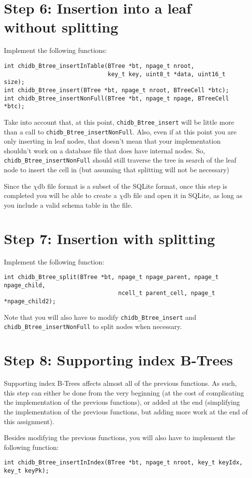 \documentclass[10pt]{article}
\newcommand{\chidb}{$\chi$\textsf{db}}
\begin{document}
\section*{Step 6: Insertion into a leaf without splitting}

Implement the following functions:

\begin{verbatim}
int chidb_Btree_insertInTable(BTree *bt, npage_t nroot, 
                              key_t key, uint8_t *data, uint16_t size);
int chidb_Btree_insert(BTree *bt, npage_t nroot, BTreeCell *btc);
int chidb_Btree_insertNonFull(BTree *bt, npage_t npage, BTreeCell *btc);
\end{verbatim}

Take into account that, at this point, \verb+chidb_Btree_insert+ will be little more than a call to \verb+chidb_Btree_insertNonFull+. Also, even if at this point you are only inserting in leaf nodes, that doesn't mean that your implementation shouldn't work on a database file that does have internal nodes. So, \verb+chidb_Btree_insertNonFull+ should still traverse the tree in search of the leaf node to insert the cell in (but assuming that splitting will not be necessary)

Since the \chidb{} file format is a subset of the SQLite format, once this step is completed you will be able to create a \chidb{} file and open it in SQLite, as long as you include a valid schema table in the file.

\section*{Step 7: Insertion with splitting}

Implement the following function:

\begin{verbatim}
int chidb_Btree_split(BTree *bt, npage_t npage_parent, npage_t npage_child, 
                                 ncell_t parent_cell, npage_t *npage_child2);
\end{verbatim}

Note that you will also have to modify \verb+chidb_Btree_insert+ and \verb+chidb_Btree_insertNonFull+ to split nodes when necessary.

\section*{Step 8: Supporting index B-Trees}

Supporting index B-Trees affects almost all of the previous functions. As such, this step can either be done from the very beginning (at the cost of complicating the implementation of the previous functions), or added at the end (simplifying the implementation of the previous functions, but adding more work at the end of this assignment).

Besides modifying the previous functions, you will also have to implement the following function:

\begin{verbatim}
int chidb_Btree_insertInIndex(BTree *bt, npage_t nroot, key_t keyIdx, key_t keyPk);
\end{verbatim}
\end{document}
